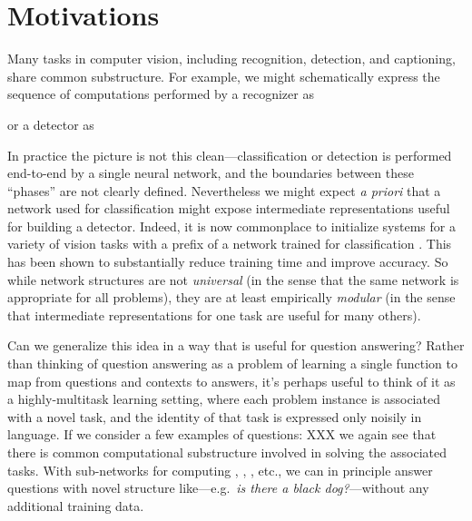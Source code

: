 \documentclass[10pt,twocolumn,letterpaper]{article}
\begin{document}


\section{Motivations}

Many tasks in computer vision, including recognition, detection, and captioning,
share common substructure. For example, we might schematically express the
sequence of computations performed by a recognizer as
\begin{flushleft}
\end{flushleft}
or a detector as
\begin{flushleft}
\end{flushleft}

In practice the picture is not this clean---classification or detection is
performed end-to-end by a single neural network, and the boundaries between
these ``phases'' are not clearly defined. Nevertheless we might expect \textit{a
priori} that a network used for classification might expose intermediate
representations useful for building a detector. Indeed, it is now commonplace to
initialize systems for a variety of vision tasks with a prefix of a network
trained for classification \cite{Long14FullyConvolutional}. This has been shown
to substantially reduce training time and improve accuracy. So while network
structures are not \emph{universal} (in the sense that the same network is
appropriate for all problems), they are at least empirically \emph{modular} (in
the sense that intermediate representations for one task are useful for many
others). 

Can we generalize this idea in a way that is useful for question answering?
Rather than thinking of question answering as a problem of learning a single
function to map from questions and contexts to answers, it's perhaps useful to
think of it as a highly-multitask learning setting, where each problem instance
is associated with a novel task, and the identity of that task is expressed only
noisily in language. If we consider a few examples of questions:
XXX
we again see that there is common computational substructure involved in solving
the associated tasks.  With sub-networks for computing ,
, , etc., we can in principle answer
questions with novel structure like---e.g.\ {\it is there a black
dog?}---without any additional training data.
\end{document}
